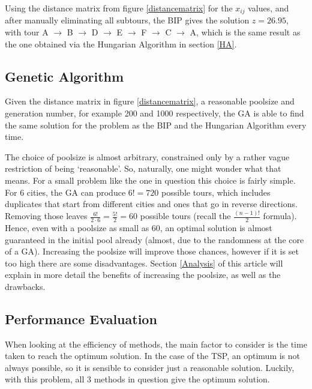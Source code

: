 Using the distance matrix from figure \ref{distancematrix} for the $x_{ij}$ values, and after manually eliminating all subtours, the BIP gives the solution $z=26.95$, with tour A $\rightarrow$ B $\rightarrow$ D $\rightarrow$ E $\rightarrow$ F $\rightarrow$ C $\rightarrow$ A, which is the same result as the one obtained via the Hungarian Algorithm in section \ref{HA}.
	
\subsection{Genetic Algorithm}	
	
Given the distance matrix in figure \ref{distancematrix}, a reasonable poolsize and generation number, for example 200 and 1000 respectively, the GA is able to find the same solution for the problem as the BIP and the Hungarian Algorithm every time.

The choice of poolsize is almost arbitrary, constrained only by a rather vague restriction of being `reasonable'. So, naturally, one might wonder what that means. For a small problem like the one in question this choice is fairly simple. For 6 cities, the GA can produce $6!=720$ possible tours, which includes duplicates that start from different cities and ones that go in reverse directions. Removing those leaves $\frac{6!}{2\cdot{6}}=\frac{5!}{2}=60$ possible tours (recall the $\frac{(n-1)!}{2}$ formula). Hence, even with a poolsize as small as 60, an optimal solution is almost guaranteed in the initial pool already (almost, due to the randomness at the core of a GA). Increasing the poolsize will improve those chances, however if it is set too high there are some disadvantages. Section \ref{Analysis} of this article will explain in more detail the benefits of increasing the poolsize, as well as the drawbacks.

\subsection{Performance Evaluation}	
	
When looking at the efficiency of methods, the main factor to consider is the time taken to reach the optimum solution. In the case of the TSP, an optimum is not always possible, so it is sensible to consider just a reasonable solution. Luckily, with this problem, all 3 methods in question give the optimum solution.


